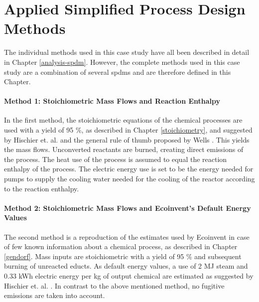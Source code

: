 \section{Applied Simplified Process Design Methods}

The individual methods used in this case study have all been described in detail in Chapter \ref{analysis-spdm}. However, the complete methods used in this case study are a combination of several \aclp{spdm} and are therefore defined in this Chapter.

\paragraph{Method 1: Stoichiometric Mass Flows and Reaction Enthalpy}
In the first method, the stoichiometric equations of the chemical processes are used with a yield of 95 \%, as described in Chapter \ref{stoichiometry}, and suggested by Hischier et. al. \cite{Hischier.2005} and the general rule of thumb proposed by Wells \cite{Wells.1991}. This yields the mass flows. Unconverted reactants are burned, creating direct emissions of the process. The heat use of the process is assumed to equal the reaction enthalpy of the process. The electric energy use is set to be the energy needed for pumps to supply the cooling water needed for the cooling of the reactor according to the reaction enthalpy.


\paragraph{Method 2: Stoichiometric Mass Flows and Ecoinvent's Default Energy Values}
The second method is a reproduction of the estimates used by Ecoinvent \cite{Hischier.2005} in case of few known information about a chemical process, as described in Chapter \ref{gendorf}. Mass inputs are stoichiometric with a yield of 95 \% and subsequent burning of unreacted educts. As default energy values, a use of 2 MJ steam and 0.33 kWh electric energy per kg of output chemical are estimated as suggested by Hischier et. al. \cite{Hischier.2005}. In contrast to the above mentioned method, no fugitive emissions are taken into account.



